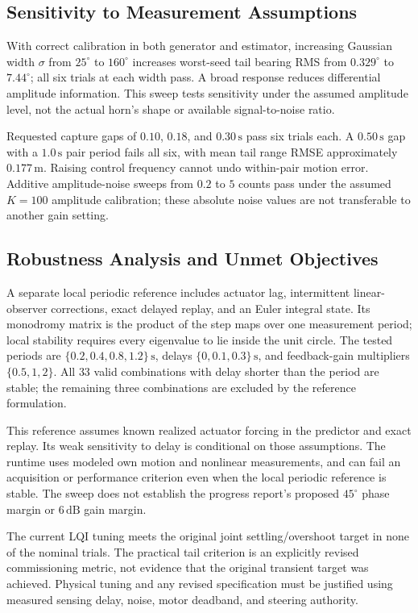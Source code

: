 \subsection{Sensitivity to Measurement Assumptions}
With correct calibration in both generator and estimator, increasing Gaussian width $\sigma$ from $25^\circ$ to $160^\circ$ increases worst-seed tail bearing RMS from $0.329^\circ$ to $7.44^\circ$; all six trials at each width pass. A broad response reduces differential amplitude information. This sweep tests sensitivity under the assumed amplitude level, not the actual horn's shape or available signal-to-noise ratio.

Requested capture gaps of $0.10$, $0.18$, and $0.30\,\mathrm s$ pass six trials each. A $0.50\,\mathrm s$ gap with a $1.0\,\mathrm s$ pair period fails all six, with mean tail range RMSE approximately $0.177\,\mathrm m$. Raising control frequency cannot undo within-pair motion error. Additive amplitude-noise sweeps from $0.2$ to $5$ counts pass under the assumed $K=100$ amplitude calibration; these absolute noise values are not transferable to another gain setting.

\subsection{Robustness Analysis and Unmet Objectives}
A separate local periodic reference includes actuator lag, intermittent linear-observer corrections, exact delayed replay, and an Euler integral state. Its monodromy matrix is the product of the step maps over one measurement period; local stability requires every eigenvalue to lie inside the unit circle. The tested periods are $\{0.2,0.4,0.8,1.2\}\,\mathrm s$, delays $\{0,0.1,0.3\}\,\mathrm s$, and feedback-gain multipliers $\{0.5,1,2\}$. All $33$ valid combinations with delay shorter than the period are stable; the remaining three combinations are excluded by the reference formulation.

This reference assumes known realized actuator forcing in the predictor and exact replay. Its weak sensitivity to delay is conditional on those assumptions. The runtime uses modeled own motion and nonlinear measurements, and can fail an acquisition or performance criterion even when the local periodic reference is stable. The sweep does not establish the progress report's proposed $45^\circ$ phase margin or $6\,\mathrm{dB}$ gain margin.

The current LQI tuning meets the original joint settling/overshoot target in none of the nominal trials. The practical tail criterion is an explicitly revised commissioning metric, not evidence that the original transient target was achieved. Physical tuning and any revised specification must be justified using measured sensing delay, noise, motor deadband, and steering authority.

